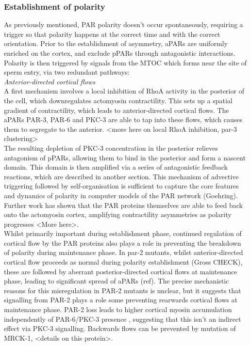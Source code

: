 \documentclass[12pt]{"article"}
\begin{document}
\subsubsection{Establishment of polarity}

As previously mentioned, PAR polarity doesn’t occur spontaneously, requiring a trigger so that polarity happens at the correct time and with the correct orientation. Prior to the establishment of asymmetry, aPARs are uniformly enriched on the cortex, and exclude pPARs through antagonistic interactions. Polarity is then triggered by signals from the MTOC which forms near the site of sperm entry, via two redundant pathways:\\

\textit{Anterior-directed cortical flows}\\

A first mechanism involves a local inhibition of RhoA activity in the posterior of the cell, which downregulates actomyosin contractility. This sets up a spatial gradient of contractility, which leads to anterior-directed cortical flows. The aPARs PAR-3, PAR-6 and PKC-3 are able to tap into these flows, which causes them to segregate to the anterior. <more here on local RhoA inhibition, par-3 clustering>\\

The resulting depletion of PKC-3 concentration in the posterior relieves antagonism of pPARs, allowing them to bind in the posterior and form a nascent domain. This domain is then amplified via a series of antagonistic feedback reactions, which are described in another section. This mechanism of advective triggering followed by self-organisation is sufficient to capture the core features and dynamics of polarity in computer models of the PAR network (Goehring).\\

Further work has shown that the PAR proteins themselves are able to feed back onto the actomyosin cortex, amplifying contractility asymmetries as polarity progresses \citep{Gross2018} <More here>.\\

Whilst primarily important during establishment phase, continued regulation of cortical flow by the PAR proteins also plays a role in preventing the breakdown of polarity during maintenance phase. In par-2 mutants, whilst anterior-directed cortical flow proceeds as normal during polarity establishment (Gross CHECK), these are followed by aberrant posterior-directed cortical flows at maintenance phase, leading to significant spread of aPARs (ref). The precise mechanistic reasons for this misregulation in PAR-2 mutants is unclear, but it suggests that signalling from PAR-2 plays a role some preventing rearwards cortical flows at maintenance phase.  PAR-2 loss leads to higher cortical myosin accumulation independently of PAR-6/PKC-3 presence \citep{Munro2004}\citep{Beatty2013}, suggesting that this isn’t an indirect effect via PKC-3 signalling. Backwards flows can be prevented by mutation of MRCK-1, <details on this protein>.\\
\end{document}
